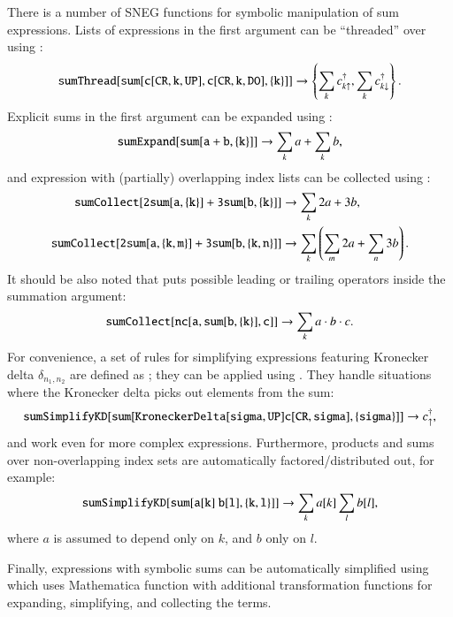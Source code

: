 \documentclass[3p,number,preprint]{elsarticle}
\begin{document}
There is a number of SNEG functions for symbolic
manipulation of sum expressions. Lists of expressions in the first
argument can be ``threaded'' over using :
%
\begin{equation}
{\tt sumThread[sum[{c[CR,k,UP],c[CR,k,DO]},\{k\}]]}
\to \left\{\sum_k c^\dag_{k\uparrow}, \sum_k c^\dag_{k\downarrow}\right\}.
\end{equation}
%
Explicit sums in the first argument can be expanded using 
:
%
\begin{equation}
{\tt sumExpand[sum[a+b,\{k\}]]} \to \sum_k a + \sum_k b,
\end{equation}
%
and expression with (partially) overlapping index lists can be
collected using :
%
\begin{equation}
\begin{split}
{\tt sumCollect[2 sum[a,\{k\}] + 3 sum[b,\{k\}]]}
&\to \sum_k 2a+3b,\\
{\tt sumCollect[2 sum[a,\{k,m\}] + 3 sum[b,\{k,n\}]]}
& \to \sum_k \left(\sum_m 2a + \sum_n 3b\right).
\end{split}
\end{equation}
%
It should be also noted that  puts possible leading
or trailing operators inside the summation argument:
%
\begin{equation}
{\tt sumCollect[nc[a,sum[b,\{k\}],c]]} \to \sum_k a \cdot b \cdot c.
\end{equation}
%
For convenience, a set of rules for simplifying expressions featuring
Kronecker delta $\delta_{n_1,n_2}$ are defined as
; they can be applied using 
. They handle situations where the Kronecker delta
picks out elements from the sum:
%
\begin{equation}
{\tt sumSimplifyKD[sum[KroneckerDelta[sigma,UP] c[CR,sigma],\{sigma\}]]}
\to c^\dag_\uparrow,
\end{equation}
%
and work even for more complex expressions. Furthermore, products and
sums over non-overlapping index sets are automatically
factored/distributed out, for example:
%
\begin{equation}
{\tt sumSimplifyKD[sum[a[k]\ b[l], \{k,l\}]]} \to \sum_k a[k] \sum_l
b[l],
\end{equation}
%
where $a$ is assumed to depend only on $k$, and $b$ only on $l$.

Finally, expressions with symbolic sums can be automatically
simplified using  which uses Mathematica function
 with additional transformation functions for
expanding, simplifying, and collecting the terms.
\end{document}
